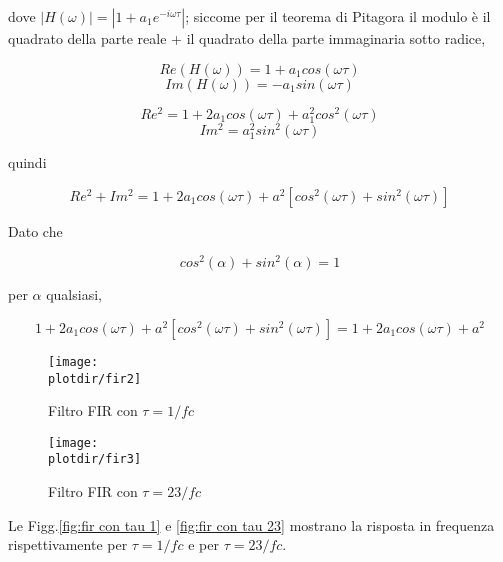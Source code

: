 	 dove $|H(\omega)| = |1 + a_1 e^{-i\omega \tau}|$; siccome per il teorema di Pitagora il
	 modulo \`e il quadrato della parte reale + il quadrato della parte
	 immaginaria sotto radice,

		 \begin{equation}
	  Re(H(\omega)) = 1 + a_1 cos(\omega \tau)
		 \end{equation}
		 \begin{equation}
		Im(H(\omega)) = - a_1 sin(\omega \tau)
		 \end{equation}

		 \begin{equation}
	  Re^2 = 1 + 2 a_1 cos(\omega \tau) + a_1^2 cos^2(\omega \tau)
		 \end{equation}
		 \begin{equation}
		Im^2 = a_1^2 sin^2(\omega \tau)
		 \end{equation}

		quindi
		
		 \begin{equation}
		Re^2 + Im^2 = 1 + 2 a_1 cos(\omega \tau) + a^2 [ cos^2(\omega \tau) + sin^2(\omega \tau) ]
		 \end{equation}

		 Dato che

		 \begin{equation}
				cos^2(\alpha) + sin^2(\alpha) = 1
		 \end{equation}

		 per $\alpha$ qualsiasi,

		 \begin{equation}
				1 + 2 a_1 cos(\omega \tau) + a^2 [ cos^2(\omega \tau) + sin^2(\omega \tau) ] = 1 + 2 a_1 cos(\omega \tau) + a^2
		 \end{equation}
		 \begin{figure}[htb]
			 \begin{center}
					\texttt{[image: \\plotdir/fir2]}
					\caption{Filtro FIR con $\tau = 1/fc$\label{fig:fir con tau 1}}
			 \end{center}
		 \end{figure}
		 \begin{figure}[htb]
			 \begin{center}
					\texttt{[image: \\plotdir/fir3]}
					\caption{Filtro FIR con $\tau = 23/fc$\label{fig:fir con tau 23}}
			 \end{center}
		 \end{figure}
		 Le Figg.\vref{fig:fir con tau 1} e \vref{fig:fir con tau 23} mostrano la
		 risposta in frequenza rispettivamente per $\tau = 1/fc$ e per $\tau = 23/fc$.

